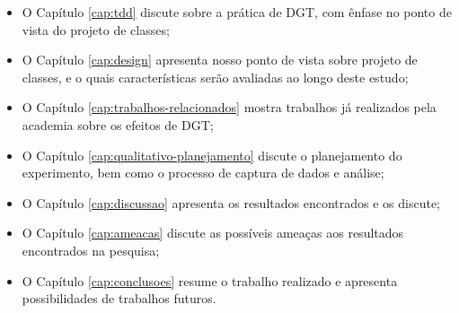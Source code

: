 \begin{itemize}
	\item O Capítulo \ref{cap:tdd} discute sobre a prática de DGT, com ênfase no
	ponto de vista do projeto de classes;
  
	\item O Capítulo \ref{cap:design} apresenta nosso ponto de vista sobre
	projeto de classes, e o quais características serão avaliadas ao longo deste estudo;
	
	\item O Capítulo \ref{cap:trabalhos-relacionados} mostra trabalhos já
	realizados pela academia sobre os efeitos de DGT;

	\item O Capítulo \ref{cap:qualitativo-planejamento} discute o planejamento do experimento,
	bem como o processo de captura de dados e análise;

	\item O Capítulo \ref{cap:discussao} apresenta os resultados encontrados e
	os discute;
	
	\item O Capítulo \ref{cap:ameacas} discute as possíveis ameaças aos resultados
	encontrados na pesquisa;
	
	\item O Capítulo \ref{cap:conclusoes} resume o trabalho realizado e apresenta
	possibilidades de trabalhos futuros.
\end{itemize}

